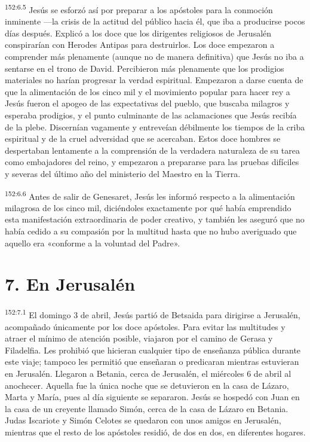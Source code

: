 \par
\textsuperscript{152:6.5} Jesús se esforzó así por preparar a los apóstoles para la conmoción inminente ---la crisis de la actitud del público hacia él, que iba a producirse pocos días después. Explicó a los doce que los dirigentes religiosos de Jerusalén conspirarían con Herodes Antipas para destruirlos. Los doce empezaron a comprender más plenamente (aunque no de manera definitiva) que Jesús no iba a sentarse en el trono de David. Percibieron más plenamente que los prodigios materiales no harían progresar la verdad espiritual. Empezaron a darse cuenta de que la alimentación de los cinco mil y el movimiento popular para hacer rey a Jesús fueron el apogeo de las expectativas del pueblo, que buscaba milagros y esperaba prodigios, y el punto culminante de las aclamaciones que Jesús recibía de la plebe. Discernían vagamente y entreveían débilmente los tiempos de la criba espiritual y de la cruel adversidad que se acercaban. Estos doce hombres se despertaban lentamente a la comprensión de la verdadera naturaleza de su tarea como embajadores del reino, y empezaron a prepararse para las pruebas difíciles y severas del último año del ministerio del Maestro en la Tierra.

\par
\textsuperscript{152:6.6} Antes de salir de Genesaret, Jesús les informó respecto a la alimentación milagrosa de los cinco mil, diciéndoles exactamente por qué había emprendido esta manifestación extraordinaria de poder creativo, y también les aseguró que no había cedido a su compasión por la multitud hasta que no hubo averiguado que aquello era «conforme a la voluntad del Padre».

\section*{7. En Jerusalén}
\par
\textsuperscript{152:7.1} El domingo 3 de abril, Jesús partió de Betsaida para dirigirse a Jerusalén, acompañado únicamente por los doce apóstoles. Para evitar las multitudes y atraer el mínimo de atención posible, viajaron por el camino de Gerasa y Filadelfia. Les prohibió que hicieran cualquier tipo de enseñanza pública durante este viaje; tampoco les permitió que enseñaran o predicaran mientras estuvieran en Jerusalén. Llegaron a Betania, cerca de Jerusalén, el miércoles 6 de abril al anochecer. Aquella fue la única noche que se detuvieron en la casa de Lázaro, Marta y María, pues al día siguiente se separaron. Jesús se hospedó con Juan en la casa de un creyente llamado Simón, cerca de la casa de Lázaro en Betania. Judas Iscariote y Simón Celotes se quedaron con unos amigos en Jerusalén, mientras que el resto de los apóstoles residió, de dos en dos, en diferentes hogares.

